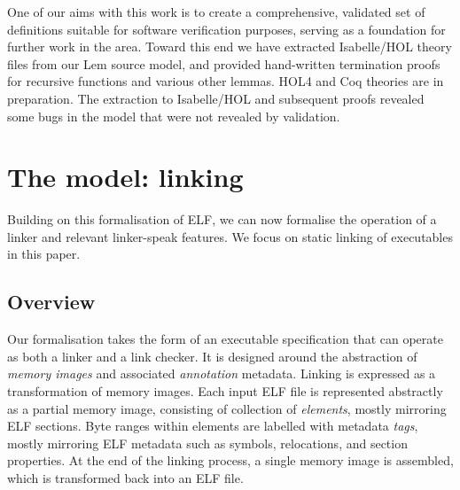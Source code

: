 \documentclass[preprint,10pt]{sigplanconf-pldi16}
\begin{document}
One of our aims with this work is to create a comprehensive, validated set of definitions suitable for software verification purposes, serving as a foundation for further work in the area.
Toward this end we have extracted Isabelle/HOL theory files from our Lem source model, and provided hand-written termination proofs for recursive functions and various other lemmas.
HOL4 and Coq theories are in preparation.
The extraction to Isabelle/HOL and subsequent proofs revealed some bugs in the model that were not revealed by validation.




\section{The model: linking}

Building on this formalisation of ELF, we can now formalise the operation of a linker and relevant linker-speak features.
We focus on static linking of executables in this paper.

\subsection{Overview}

Our formalisation takes the form of an executable specification that 
can operate as both a linker and a link checker.
It is designed around the abstraction of \emph{memory images} and associated \emph{annotation} metadata.
Linking is expressed as a transformation of memory images.
Each input ELF file is represented abstractly as a partial memory image, consisting of 
collection of \emph{elements}, mostly mirroring ELF sections.
Byte ranges within elements are labelled with metadata \emph{tags}, 
mostly mirroring ELF metadata such as symbols, relocations, and section properties.
At the end of the linking process, a single memory image is assembled,
which is transformed back into an ELF file.
\end{document}

